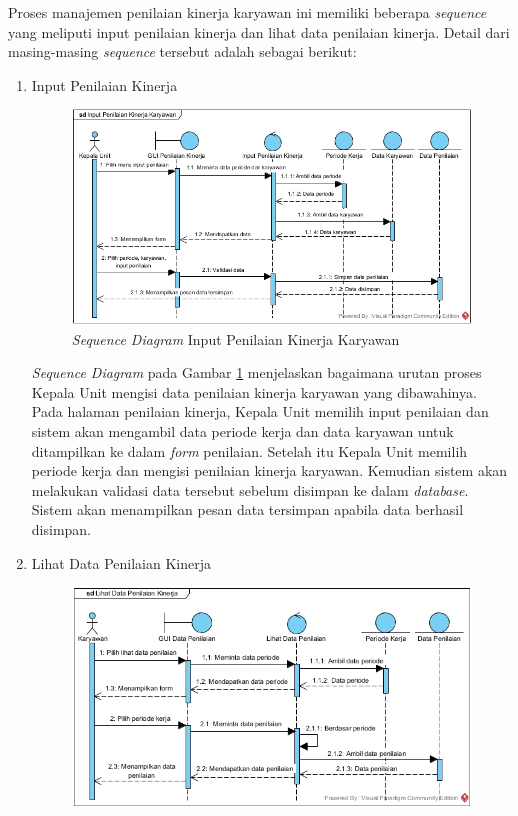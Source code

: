 \begin{enumerate}
            	Proses manajemen penilaian kinerja karyawan ini memiliki beberapa \emph{sequence} yang meliputi input penilaian kinerja dan lihat data penilaian kinerja. Detail dari masing-masing \emph{sequence} tersebut adalah sebagai berikut:
            	\begin{enumerate}[label=\alph*.]
            	    \itemsep0em
            	    \item Input Penilaian Kinerja
            	    \begin{figure}[H]
            		    \centering
            		    \includegraphics[width=14cm]{gambar/sequence/input-penilaian-kinerja}
            		    \caption{\emph{Sequence Diagram} Input Penilaian Kinerja Karyawan}
            		    \label{sequence_input_penilaian}
            		\end{figure}
            		\emph{Sequence Diagram} pada Gambar \ref{sequence_input_penilaian} menjelaskan bagaimana urutan proses Kepala Unit mengisi data penilaian kinerja karyawan yang dibawahinya. Pada halaman penilaian kinerja, Kepala Unit memilih input penilaian dan sistem akan mengambil data periode kerja dan data karyawan untuk ditampilkan ke dalam \emph{form} penilaian. Setelah itu Kepala Unit memilih periode kerja dan mengisi penilaian kinerja karyawan. Kemudian sistem akan melakukan validasi data tersebut sebelum disimpan ke dalam \emph{database}. Sistem akan menampilkan pesan data tersimpan apabila data berhasil disimpan. \newpage
            	    \item Lihat Data Penilaian Kinerja
            	    \begin{figure}[H]
            		    \centering
            		    \includegraphics[width=13cm]{gambar/sequence/lihat-data-penilaian}

\end{figure}
\end{enumerate}
\end{enumerate}
